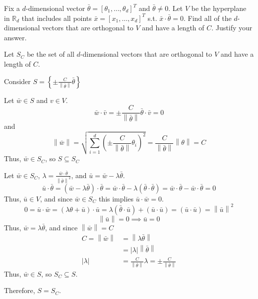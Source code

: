 \documentclass[12pt, letterpaper]{article}
\newcommand{\R}{\mathbb{R}}
\begin{document}
\newcommand{\barv}[1]{\bar{#1}=[#1_1,\dots,#1_d]^T}
\begin{subproblem}{}
    Fix a $d$-dimensional vector $\barv{\theta}$ and $\bar{\theta} \neq 0$. 
    Let $V$ be the hyperplane in $\R_d$ that includes all points $\barv{x}$
    s.t. $\bar{x} \cdot \bar{\theta} = 0$. Find all of the $d$-dimensional vectors that are orthogonal to 
    $V$ and have a length of $C$. Justify your answer.
\end{subproblem}
\begin{solution}
    \setlength{\parindent}{0pt}
    Let $S_C$ be the set of all $d$-dimensional vectors that are orthogonal to 
    $V$ and have a length of $C$.

    Consider $S=\left\{ \pm \frac{C}{\left\|\bar{\theta}\right\|} \bar{\theta}\right\}$

    Let $\bar{w} \in S$ and $v \in V$.
    \[\bar{w} \cdot \bar{v} = \pm \frac{C}{\left\|\bar{\theta}\right\|}\bar{\theta} \cdot \bar{v} = 0\]
    and
    \[\left\|\bar{w}\right\| = \sqrt{\sum_{i=1}^{d} \left( \pm \frac{C}{\left\|\bar{\theta}\right\|}\theta_i \right)^2}=\frac{C}{\left\|\bar{\theta}\right\|}\left\|\theta\right\|=C\]
    Thus, $\bar{w} \in S_C$, so $S \subseteq S_C$

    Let $\bar{w} \in S_C$, $\lambda = \frac{\bar{w} \cdot \bar{\theta}}{\left\|\bar{\theta}\right\|^2}$, and $\bar{u}=\bar{w}-\lambda\bar{\theta}$.
    \[\bar{u} \cdot \bar{\theta}=\left( \bar{w}-\lambda\bar{\theta} \right) \cdot \bar{\theta}=\bar{w} \cdot \bar{\theta} - \lambda\left( \bar{\theta} \cdot \bar{\theta} \right)= \bar{w} \cdot \bar{\theta} - \bar{w} \cdot \bar{\theta} = 0 \]
    Thus, $\bar{u} \in V$, and since $\bar{w} \in S_C$ this implies $\bar{u} \cdot \bar{w} = 0$.
    \[0=\bar{u} \cdot \bar{w}=\left( \lambda\theta + \bar{u} \right) \cdot \bar{u} = \lambda\left( \bar{\theta} \cdot \bar{u} \right) + \left( \bar{u} \cdot \bar{u} \right) = \left( \bar{u} \cdot \bar{u} \right) = \left\| \bar{u}\right\|^2 \]
    \[\left\| \bar{u}\right\| = 0 \implies \bar{u} = 0\]
    Thus, $\bar{w} = \lambda \bar{\theta}$, and since $\left\|\bar{w}\right\|=C$
    \begin{align*}
        C=\left\|\bar{w}\right\| &= \left\|\lambda \bar{\theta}\right\|\\ 
        &= \left| \lambda \right| \left\|\bar{\theta}\right\|\\
        \left| \lambda \right| &= \frac{C}{\left\|\bar{\theta}\right\|}
        \lambda = \pm \frac{C}{\left\|\bar{\theta}\right\|}
    \end{align*}
    Thus, $\bar{w} \in S$, so $S_C \subseteq S$.

    Therefore, $S=S_C$.
\end{solution}
\end{document}

